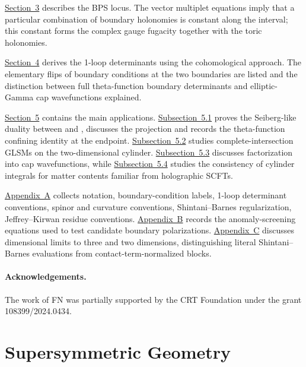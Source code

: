 \documentclass[11pt,a4paper]{article}
\makeatletter
\numberwithin{equation}{section}
\theoremstyle{plain}
\theoremstyle{definition}
\theoremstyle{remark}
\newcounter{mathrecordid}
\newcommand{\mathboxbegin}[1]{%
  \stepcounter{mathrecordid}%
  \immediate\write\mathrecords{\themathrecordid,#1}%
  \special{pdf:bann << /Type /Annot /Subtype /Link /Border [0 0 0]
    /MathBoxID \themathrecordid /F 2
    /A << /S /URI /URI (urn:mathbox:\themathrecordid) >> >>}}
\newcommand{\mathboxinlineplain}[1]{$#1$}
\newcommand{\mathboxinline}[1]{%
  $\mathboxbegin{inline}%
  \special{pdf:literal direct /MathBoxBegin\themathrecordid\space MP}%
  #1\special{pdf:literal direct /MathBoxEnd\themathrecordid\space MP}%
  \special{pdf:eann}$}
\newcommand{\recordmath}{%
  \ifmeasuring@\expandafter\mathboxinlineplain
  \else\expandafter\mathboxinline\fi}
\makeatother
\begin{document}
\hyperref[sec:bps-loci]{Section~3} describes the BPS locus. The vector multiplet equations imply that a particular combination of boundary holonomies is constant along the interval; this constant forms the complex gauge fugacity together with the toric holonomies.

\hyperref[sec:oneloop]{Section~4} derives the 1-loop determinants using the cohomological approach.  The elementary flips of boundary conditions  at the two boundaries  are listed and the distinction between full theta-function boundary determinants and elliptic-Gamma cap wavefunctions explained.

\hyperref[sec:applications-examples]{Section~5} contains the main applications.  \hyperref[sec:duality]{Subsection~5.1} proves the Seiberg-like duality between \recordmath{U(N_c)} and \recordmath{U(N_f-N_c)}, discusses the \recordmath{SU} projection and records the theta-function confining identity at the \recordmath{U(0)} endpoint.  \hyperref[sec:complete-intersections-cylinder]{Subsection~5.2} studies complete-intersection GLSMs on the two-dimensional cylinder.  \hyperref[sec:factorization-half-blocks]{Subsection~5.3} discusses factorization into cap wavefunctions, while \hyperref[sec:holographic-benchmarks]{Subsection~5.4} studies the consistency of cylinder integrals for matter contents familiar from holographic SCFTs.

\hyperref[app:notation-conventions]{Appendix~A} collects notation, boundary-condition labels, 1-loop determinant conventions, spinor and curvature conventions, Shintani--Barnes regularization, Jeffrey--Kirwan residue conventions.  \hyperref[app:anomalies]{Appendix~B} records the anomaly-screening equations used to test candidate boundary polarizations.  \hyperref[app:dimensional-limits]{Appendix~C} discusses dimensional limits to three and two dimensions, distinguishing literal Shintani--Barnes evaluations from contact-term-normalized blocks.


\paragraph{Acknowledgements.}

The work of FN was partially supported by the CRT Foundation under the grant 108399/2024.0434.


\section{Supersymmetric Geometry}\label{sec:geometry-loc}
\end{document}
